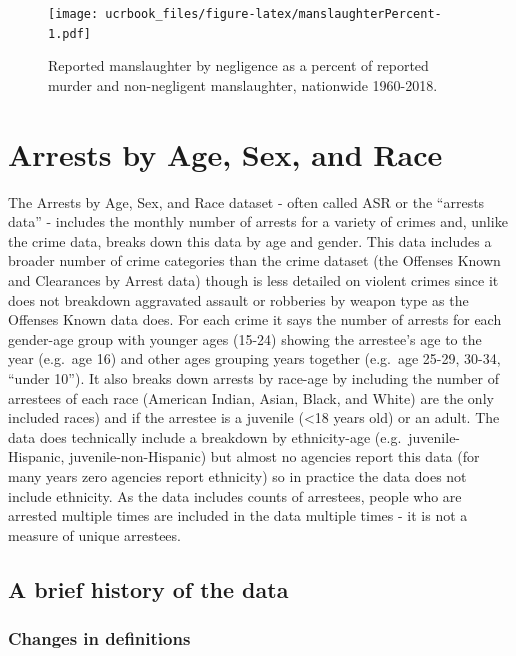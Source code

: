 \documentclass[
  12pt,
  openany]{book}
\begin{document}
\begin{figure}
\centering
\texttt{[image: ucrbook\_files/figure-latex/manslaughterPercent-1.pdf]}
\caption{\label{fig:manslaughterPercent}Reported manslaughter by negligence as a percent of reported murder and non-negligent manslaughter, nationwide 1960-2018.}
\end{figure}

\hypertarget{arrests}{%
\chapter{Arrests by Age, Sex, and Race}\label{arrests}}

The Arrests by Age, Sex, and Race dataset - often called ASR or the ``arrests data'' - includes the monthly number of arrests for a variety of crimes and, unlike the crime data, breaks down this data by age and gender. This data includes a broader number of crime categories than the crime dataset (the Offenses Known and Clearances by Arrest data) though is less detailed on violent crimes since it does not breakdown aggravated assault or robberies by weapon type as the Offenses Known data does. For each crime it says the number of arrests for each gender-age group with younger ages (15-24) showing the arrestee's age to the year (e.g.~age 16) and other ages grouping years together (e.g.~age 25-29, 30-34, ``under 10''). It also breaks down arrests by race-age by including the number of arrestees of each race (American Indian, Asian, Black, and White) are the only included races) and if the arrestee is a juvenile (\textless18 years old) or an adult. The data does technically include a breakdown by ethnicity-age (e.g.~juvenile-Hispanic, juvenile-non-Hispanic) but almost no agencies report this data (for many years zero agencies report ethnicity) so in practice the data does not include ethnicity. As the data includes counts of arrestees, people who are arrested multiple times are included in the data multiple times - it is not a measure of unique arrestees.

\hypertarget{a-brief-history-of-the-data}{%
\section{A brief history of the data}\label{a-brief-history-of-the-data}}

\hypertarget{changes-in-definitions}{%
\subsection{Changes in definitions}\label{changes-in-definitions}}
\end{document}
